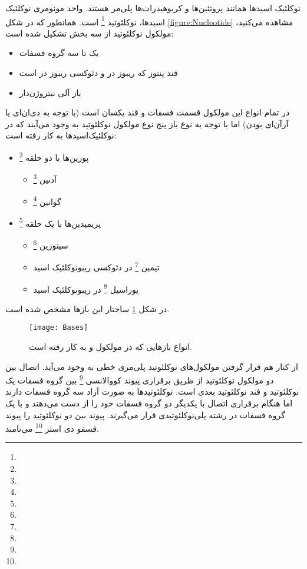 نوکلئیک اسید‌ها همانند پروتئین‌ها و کربوهیدرات‌ها پلی‌مر هستند. واحد‌ مونومری نوکلئیک اسید‌ها، نوکلئوتید
\footnote{}
است.
همانطور که در شکل
\ref{figure:Nucleotide}
مشاهده می‌کنید، مولکول نوکلئوتید از سه بخش تشکیل شده است:
\begin{itemize}
\item  یک تا سه گروه فسفات
\item  قند پنتوز که ریبوز در
و
دئوکسی ریبوز در
است
\item  باز آلی نیتروژن‌دار
\end{itemize}

در تمام انواع این مولکول قسمت فسفات و قند یکسان است (با توجه به دی‌ان‌ای یا آرآن‌ای بودن) اما با توجه به نوع باز پنج نوع مولکول نوکلئوتید به وجود می‌آیند که در نوکلئیک‌اسید‌ها
به کار رفته است:
\begin{itemize}
\item پورین‌ها با دو حلقه
\footnote{}
	\begin{itemize}
	\item آدنین
	\footnote{}
	\item گوانین
	\footnote{}
	\end{itemize}
\item پریمیدین‌ها با یک حلقه
\footnote{}
	\begin{itemize}
	\item سیتوزین
	\footnote{}
	\item تیمین
	\footnote{}
	در دئوکسی ریبونوکلئیک اسید	
	\item یوراسیل
	\footnote{}
در ریبونوکلئیک اسید
	\end{itemize}
\end{itemize}

\noindent
در شکل
\ref{figure:bases}
ساختار این باز‌ها مشخص شده است.

\begin{figure}[ht]
	\centering
	\texttt{[image: Bases]}
	\caption{انواع باز‌هایی که در مولکول
	و
	به کار رفته است.	
	}
	 \label{figure:bases}
\end{figure}

از کنار هم قرار گرفتن مولکول‌های نوکلئوتید پلی‌مری خطی به وجود می‌‌آيد. اتصال بین دو مولکول نوکلئوتید از طریق برقراری پیوند کووالانسی
\footnote{}
بین گروه فسفات یک نوکلئوتید و قند نوکلئوتید بعدی است. نوکلئوتید‌ها به صورت آزاد سه گروه فسفات دارند اما هنگام برقراری اتصال با یکدیگر دو گروه فسفات خود را از دست می‌دهند و با یک گروه فسفات در رشته پلی‌نوکلئوتیدی قرار می‌گیرند. پیوند بین دو نوکلئوتید را پیوند فسفو دی استر
\footnote{}
می‌نامند.

